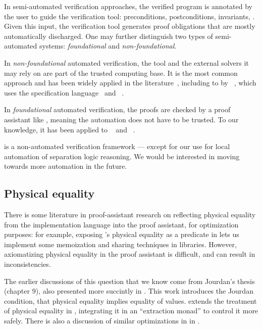 In semi-automated verification approaches, the verified program is annotated by the user to guide the verification tool: preconditions, postconditions, invariants, \etc.
Given this input, the verification tool generates proof obligations that are mostly automatically discharged.
One may further distinguish two types of semi-automated systems: \emph{foundational} and \emph{non-foundational}.

In \emph{non-foundational} automated verification, the tool and the external solvers it may rely on are part of the trusted computing base.
It is the most common approach and has been widely applied in the literature~\cite{DBLP:journals/jfp/SwamyCFSBY13, DBLP:series/natosec/0001SS17, DBLP:conf/nfm/JacobsSPVPP11, DBLP:conf/icfem/DenisJM22, DBLP:conf/nfm/AstrauskasBFGMM22, DBLP:conf/esop/FilliatreP13, DBLP:journals/pacmpl/LattuadaHCBSZHPH23, DBLP:journals/pacmpl/PulteMSMSK23}, including to \OCaml by \Cameleer~\cite{DBLP:conf/cav/PereiraR20}, which uses the \Gospel specification language~\cite{DBLP:conf/fm/ChargueraudFLP19} and \WhyThree~\cite{DBLP:conf/esop/FilliatreP13}.

In \emph{foundational} automated verification, the proofs are checked by a proof assistant like \Rocq, meaning the automation does not have to be trusted.
To our knowledge, it has been applied to \C~\cite{DBLP:conf/pldi/SammlerLKMD021} and \Rust~\cite{DBLP:journals/pacmpl/GaherSJKD24}.

\Zoo is a non-automated verification framework --- except for our use \Diaframe for local automation of separation logic reasoning. We would be interested in moving towards more automation in the future.

\subsection{Physical equality}
\label{subsec:related-work-physical-equality}

There is some literature in proof-assistant research on reflecting physical equality from the implementation language into the proof assistant, for optimization purposes: for example, exposing \OCaml's physical equality as a predicate in \Rocq lets us implement some memoization and sharing techniques in \Rocq libraries.
%
However, axiomatizing physical equality in the proof assistant is difficult, and can result in inconsistencies.

The earlier discussions of this question that we know come from Jourdan's thesis~\cite{DBLP:phd/hal/Jourdan16} (chapter 9), also presented more succintly in \cite{DBLP:journals/jar/BraibantJM14}.
%
This work introduces the Jourdan condition, that physical equality implies equality of values.
%
\cite{boulme:tel-03356701} extends the treatment of physical equality in \Rocq, integrating it in an ``extraction monad'' to control it more safely.
%
There is also a discussion of similar optimizations in \Lean in \cite{lean-pointer-optimizations}.

